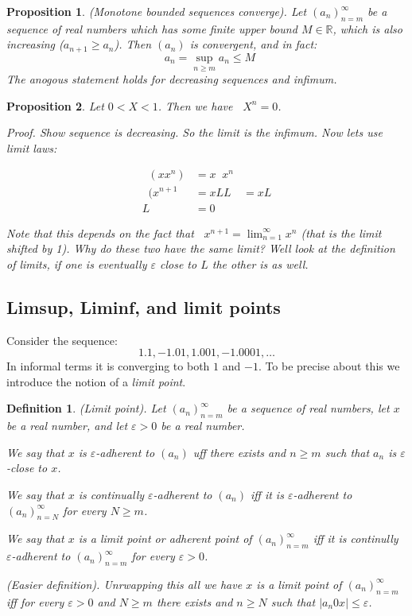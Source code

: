\documentclass{article}
\newtheorem{definition}{Definition}[subsection]
\newtheorem{proposition}{Proposition}[subsection]
\newcommand{\R}{\mathbb{R}}
\newcommand{\vep}{\varepsilon} %
\DeclareMathOperator{\inflim}{\lim_{n \to \infty}}
\let\it\textit
\begin{document}
\begin{proposition}
	(Monotone bounded sequences converge). Let
	$(a_n)_{n=m}^\infty$ be a sequence of real numbers 
	which has some finite upper bound $M\in\R$, which 
	is also increasing ($a_{n+1} \geq a_n$). Then 
	$(a_n)$ is convergent, and in fact:
	$$
	\inflim a_n = \sup_{n \geq m} a_n \leq M
	$$
	The anogous statement holds for decreasing sequences
	and infimum.
\end{proposition}

\begin{proposition}
	Let $0 < X < 1$. Then we have $\inflim X^n = 0$.

	\it{Proof}. Show sequence is decreasing. So the limit 
	is the infimum. Now lets use limit laws:
	
	\begin{align*}
		\inflim (x x^n) &= x \inflim x^n \\	
		\inflim (x^{n+1} &= x L 
		L &= x L \\
		L &= 0 
	\end{align*}

	Note that this depends on the fact that 
	$\inflim x^{n+1} = \lim_{n=1}^{\infty}x^n$ 
	(that is the limit shifted by 1). Why do these
	two have the same limit? Well look at the definition 
	of limits, if one is eventually $\vep$  close to $L$ 
	the other is as well.
\end{proposition}

\subsection{Limsup, Liminf, and limit points}

Consider the sequence:
$$
1.1, -1.01, 1.001, -1.0001, \dots
$$
In informal terms it is converging to both $1$
and $-1$. To be precise about this we 
introduce the notion of a \it{limit point}.

\begin{definition}
	(Limit point). Let $(a_n)_{n=m}^\infty$ be a sequence
	of real numbers, let $x$ be a real number, 
	and let $\vep > 0$ be a real number. 
	
	We say that $x$ is $\vep$-adherent to $(a_n)$ 
	uff there exists and $n \geq m$ such that 
	$a_n$ is $\vep$-close to $x$. 

	We say that $x$ is continually $\vep$-adherent 
	to $(a_n)$ iff it is $\vep$-adherent to $(a_n)_{n=N}^\infty$ 
	for every $N \geq m$. 

	We say that $x$ is a limit point or adherent point 
	of $(a_n)_{n=m}^\infty$ iff it is continully 
	$\vep$-adherent to $(a_n)_{n=m}^\infty$ for every $\vep > 0$.

	(Easier definition). Unrwapping this all we have 
	$x$ is a limit point of $(a_n)_{n=m}^\infty$ iff
	for every $\vep > 0$ and $N \geq m$ there exists 
	and $n \geq N$ such  that $|a_n 0 x| \leq \vep$.
\end{definition}
\end{document}
